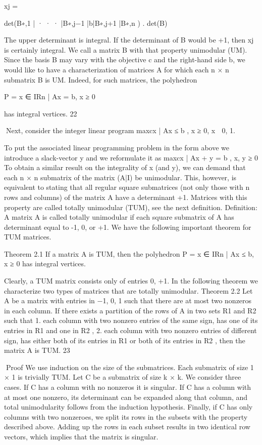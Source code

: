 \documentclass[titlepage]{book}
\theoremstyle{definition}
\begin{document}
xj =

det(B∗,1 | · · · |B∗,j−1 |b|B∗,j+1 |B∗,n )
.
det(B)

The upper determinant is integral. If the determinant of B would be +1, then xj is certainly integral.
We call a matrix B with that property unimodular (UM). Since the basis B may vary with the objective
c and the right-hand side b, we would like to have a characterization of matrices A for which each n × n
submatrix B is UM. Indeed, for such matrices, the polyhedron

P = {x ∈ IRn | Ax = b, x ≥ 0}

has integral vertices.
22

Next, consider the integer linear program
max{cx | Ax ≤ b , x ≥ 0, x ∈ {0, 1}}.

To put the associated linear programming problem in the form above we introduce a slack-vector y and
we reformulate it as
max{cx | Ax + y = b , x, y ≥ 0}
To obtain a similar result on the integrality of x (and y), we can demand that each n × n submatrix of the
matrix (A|I) be unimodular. This, however, is equivalent to stating that all regular square submatrices
(not only those with n rows and columns) of the matrix A have a determinant +1. Matrices with this
property are called totally unimodular (TUM), see the next definition.
Definition: A matrix A is called totally unimodular if each square submatrix of A has determinant equal
to -1, 0, or +1.
We have the following important theorem for TUM matrices.

Theorem 2.1 If a matrix A is TUM, then the polyhedron
P = {x ∈ IRn | Ax ≤ b, x ≥ 0}
has integral vertices.

Clearly, a TUM matrix consists only of entries 0, +1. In the following theorem we characterize two types
of matrices that are totally unimodular.
Theorem 2.2 Let A be a matrix with entries in {−1, 0, 1} such that there are at most two nonzeros in
each column. If there exists a partition of the rows of A in two sets R1 and R2 such that
1. each column with two nonzero entries of the same sign, has one of its entries in R1 and one in R2 ,
2. each column with two nonzero entries of different sign, has either both of its entries in R1 or both of
its entries in R2 ,
then the matrix A is TUM.
23

Proof
We use induction on the size of the submatrices. Each submatrix of size 1 × 1 is trivially TUM. Let C be
a submatrix of size k × k. We consider three cases. If C has a column with no nonzeros it is singular. If
C has a column with at most one nonzero, its determinant can be expanded along that column, and total
unimodularity follows from the induction hypothesis. Finally, if C has only columns with two nonzeroes,
we split its rows in the subsets with the property described above. Adding up the rows in each subset
results in two identical row vectors, which implies that the matrix is singular.
✷
\end{document}

